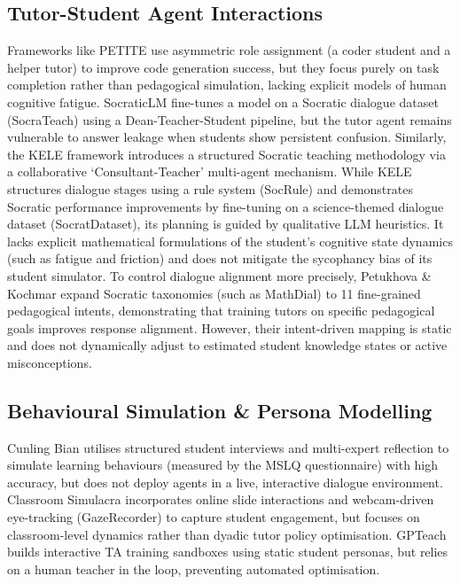 \subsection{Tutor-Student Agent Interactions}
Frameworks like PETITE \cite{ozdemir2026enhancing} use asymmetric role assignment (a coder student and a helper tutor) to improve code generation success, but they focus purely on task completion rather than pedagogical simulation, lacking explicit models of human cognitive fatigue. SocraticLM \cite{liu2024socraticlm} fine-tunes a model on a Socratic dialogue dataset (SocraTeach) using a Dean-Teacher-Student pipeline, but the tutor agent remains vulnerable to answer leakage when students show persistent confusion. Similarly, the KELE framework \cite{peng2025kele} introduces a structured Socratic teaching methodology via a collaborative `Consultant-Teacher' multi-agent mechanism. While KELE structures dialogue stages using a rule system (SocRule) and demonstrates Socratic performance improvements by fine-tuning on a science-themed dialogue dataset (SocratDataset), its planning is guided by qualitative LLM heuristics. It lacks explicit mathematical formulations of the student's cognitive state dynamics (such as fatigue and friction) and does not mitigate the sycophancy bias of its student simulator. To control dialogue alignment more precisely, Petukhova \& Kochmar \cite{petukhova2025intent} expand Socratic taxonomies (such as MathDial) to 11 fine-grained pedagogical intents, demonstrating that training tutors on specific pedagogical goals improves response alignment. However, their intent-driven mapping is static and does not dynamically adjust to estimated student knowledge states or active misconceptions.

\subsection{Behavioural Simulation \& Persona Modelling}
Cunling Bian \cite{bian2026generative} utilises structured student interviews and multi-expert reflection to simulate learning behaviours (measured by the MSLQ questionnaire) with high accuracy, but does not deploy agents in a live, interactive dialogue environment. Classroom Simulacra \cite{xu2025classroom} incorporates online slide interactions and webcam-driven eye-tracking (GazeRecorder) to capture student engagement, but focuses on classroom-level dynamics rather than dyadic tutor policy optimisation. GPTeach \cite{markel2023gpteach} builds interactive TA training sandboxes using static student personas, but relies on a human teacher in the loop, preventing automated optimisation. 

